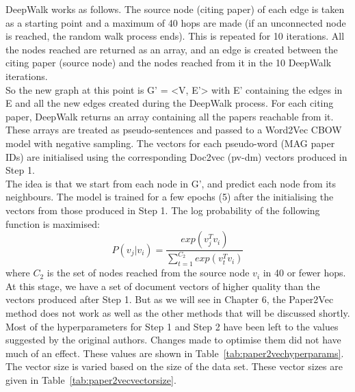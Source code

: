 DeepWalk works as follows. The source node (citing paper) of each edge is taken as a starting point and a maximum of 40 hops are made (if an unconnected node is reached, the random walk process ends). This is repeated for 10 iterations. All the nodes reached are returned as an array, and an edge is created between the citing paper (source node) and the nodes reached from it in the 10 DeepWalk iterations. \\
So the new graph at this point is G' = <V, E'> with E' containing the edges in E and all the new edges created during the DeepWalk process. For each citing paper, DeepWalk returns an array containing all the papers reachable from it. These arrays are treated as pseudo-sentences and passed to a Word2Vec CBOW model with negative sampling. The vectors for each pseudo-word (MAG paper IDs) are initialised using the corresponding Doc2vec (pv-dm) vectors produced in Step 1.\\
The idea is that we start from each node in G', and predict each node from its neighbours. The model is trained for a few epochs (5) after the initialising the vectors from those produced in Step 1.
The log probability of the following function is maximised: 
\begin{equation}
    P(v_j|{v_i}) = \frac{exp(v_j^Tv_i)}{\sum_{t=1}^{C_2}{exp(v_t^Tv_i)}}
\end{equation}
where $C_2$ is the set of nodes reached from the source node $v_i$ in 40 or fewer hops.\\
At this stage, we have a set of document vectors of higher quality than the vectors produced after Step 1. But as we will see in Chapter 6, the Paper2Vec method does not work as well as the other methods that will be discussed shortly.\\
Most of the hyperparameters for Step 1 and Step 2 have been left to the values suggested by the original authors. Changes made to optimise them did not have much of an effect. These values are shown in Table~\ref{tab:paper2vechyperparams}. The vector size is varied based on the size of the data set. These vector sizes are given in Table~\ref{tab:paper2vecvectorsize}.

